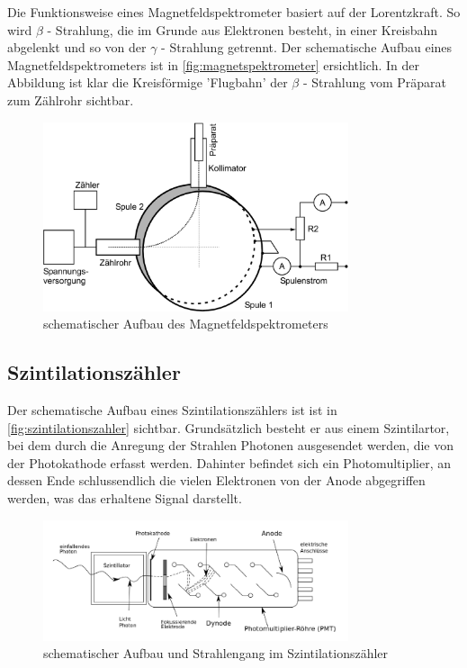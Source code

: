 \documentclass[12pt,english,ngerman]{scrartcl}
\begin{document}
Die Funktionsweise eines Magnetfeldspektrometer basiert auf der Lorentzkraft. So wird \(\beta\) - Strahlung, die im Grunde aus
Elektronen besteht, in einer Kreisbahn abgelenkt und so von der \(\gamma\) - Strahlung getrennt. Der schematische Aufbau eines
Magnetfeldspektrometers ist in \autoref{fig:magnetspektrometer} ersichtlich. In der Abbildung ist klar die Kreisförmige
'Flugbahn' der \(\beta\) - Strahlung vom Präparat zum Zählrohr sichtbar.\cite[]{}


\begin{figure}[H]
  \begin{center}
  \includegraphics[width = 0.8\textwidth]{./figures/fig5.png}
	
\end{center}
	\caption{schematischer Aufbau des Magnetfeldspektrometers~\cite[]{}}
	\label{fig:magnetspektrometer}

\end{figure}


\subsection{Szintilationszähler}

Der schematische Aufbau eines Szintilationszählers ist ist in \autoref{fig:szintilationszahler} sichtbar.
Grundsätzlich besteht er aus einem Szintilartor, bei dem durch die Anregung der Strahlen Photonen ausgesendet werden,
die von der Photokathode erfasst werden. Dahinter befindet sich ein Photomultiplier, an dessen Ende schlussendlich
die vielen Elektronen von der Anode abgegriffen werden, was das erhaltene Signal darstellt.\cite[]{}

\begin{figure}[H]
  \begin{center}
  \includegraphics[width = 0.8\textwidth]{./figures/szintilationszahler.png}
	
\end{center}
	\caption{schematischer Aufbau und Strahlengang im Szintilationszähler~\cite[]{}}
	\label{fig:szintilationszahler}

\end{figure}
\end{document}
